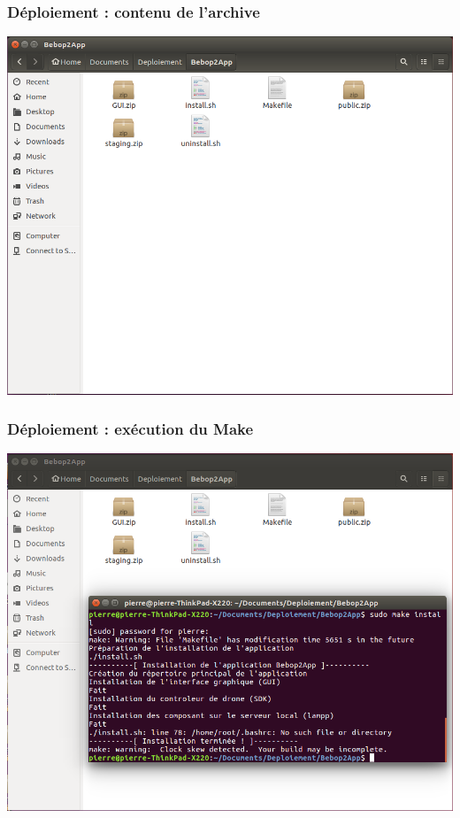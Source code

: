 \documentclass{beamer}
\begin{document}
	
	\begin{frame}
		\begin{center}
		\frametitle{Déploiement : contenu de l'archive}
        \includegraphics[scale=0.3]{result_deploiment_1.png}
		\end{center}
	\end{frame}
	
	
	\begin{frame}
		\begin{center}
		\frametitle{Déploiement : exécution du Make}
        \includegraphics[scale=0.3]{result_deploiment_2.png}
		\end{center}
	\end{frame}
\end{document}
